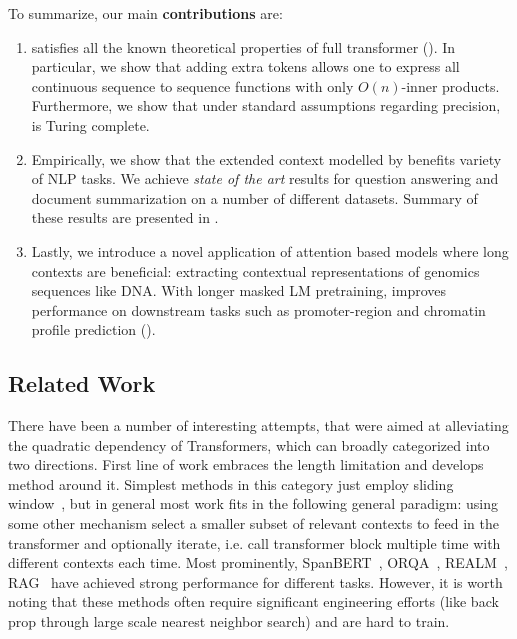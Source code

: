 To summarize, our main \textbf{contributions} are:
\begin{enumerate}[leftmargin=6mm, itemsep=2mm, partopsep=0pt,parsep=0pt]
    \item 
    \bigb satisfies all the known theoretical properties of full transformer (). In particular, we show that adding extra tokens allows one to express all continuous sequence to sequence functions with only $O(n)$-inner products. Furthermore, we show that under standard assumptions regarding precision, \bigb is Turing complete.
    
    \item 
    Empirically, we show that the extended context modelled by \bigb benefits variety of NLP tasks. 
    We achieve \emph{state of the art} results for  question answering and document summarization on a number of different datasets. 
    Summary of these results are presented in .
    
    \item
    Lastly, we introduce a novel application of attention based models where long contexts 
    are beneficial: extracting contextual representations of genomics sequences like DNA. 
    With longer masked LM pretraining, \bigb improves performance on downstream tasks such as promoter-region and chromatin profile prediction (). 
\end{enumerate}

\subsection{Related Work}
There have been a number of interesting attempts, that were aimed at alleviating the quadratic dependency of Transformers, which can broadly categorized into two directions.
First line of work embraces the length limitation and develops method around it.
Simplest methods in this category just employ sliding window~\citep{wang2019multi}, but in general most work fits in the following general paradigm:
using some other mechanism select a smaller subset of relevant contexts to feed in the transformer and optionally iterate, i.e. call transformer block multiple time with different contexts each time. 
Most prominently, SpanBERT~\citep{joshi2020spanbert}, ORQA~\citep{lee2019latent}, REALM~\citep{guu2020realm}, RAG~\citep{lewis2020retrieval} have achieved strong performance for different tasks. However, it is worth noting that these methods often require significant engineering efforts (like back prop through large scale nearest neighbor search) and are hard to train.

